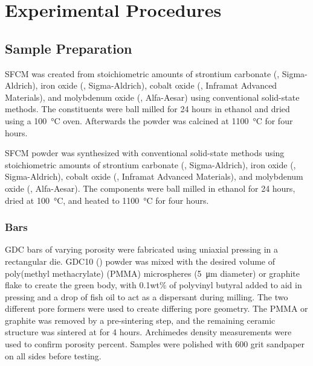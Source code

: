 


\chapter{Experimental Procedures}

\section{Sample Preparation}
    SFCM was created from stoichiometric amounts of strontium carbonate (, Sigma-Aldrich), iron oxide (, Sigma-Aldrich), cobalt oxide (, Inframat Advanced Materials), and molybdenum oxide (, Alfa-Aesar) using conventional solid-state methods.
    The constituents were ball milled for 24 hours in ethanol and dried using a \SI{100}{\celsius} oven.
    Afterwards the powder was calcined at \SI{1100}{\celsius} for four hours.

    SFCM powder was synthesized with conventional solid-state methods using stoichiometric amounts of strontium carbonate (, Sigma-Aldrich), iron oxide (, Sigma-Aldrich), cobalt oxide (, Inframat Advanced Materials), and molybdenum oxide (, Alfa-Aesar). The components were ball milled in ethanol for 24 hours, dried at \SI{100}{\celsius}, and heated to \SI{1100}{\celsius} for four hours.

    \subsection{Bars}
        GDC bars of varying porosity were fabricated using uniaxial pressing in a rectangular die.
        GDC10 () powder was mixed with the desired volume of poly(methyl methacrylate) (PMMA) microspheres (\SI{5}{\micro\meter} diameter) or graphite flake to create the green body, with 0.1wt\% of polyvinyl butyral added to aid in pressing and a drop of fish oil to act as a dispersant during milling.
        The two different pore formers were used to create differing pore geometry.
        The PMMA or graphite was removed by a  pre-sintering step, and the remaining ceramic structure was sintered at  for 4 hours.
        Archimedes density measurements were used to confirm porosity percent.
        Samples were polished with 600 grit sandpaper on all sides before testing.

